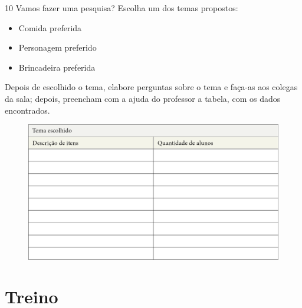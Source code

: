 
\num{10} Vamos fazer uma pesquisa? Escolha um dos temas propostos:

\begin{itemize}
\item
  Comida preferida
\item
  Personagem preferido
\item
  Brincadeira preferida
\end{itemize}

\pagebreak
Depois de escolhido o tema, elabore perguntas sobre o tema e faça-as aos colegas da sala; depois,
preencham com a ajuda do professor a tabela, com os dados encontrados.

\begin{figure}[htpb!]
\includegraphics[width=\textwidth]{./media/image98.png}
\end{figure}





\section*{Treino}

